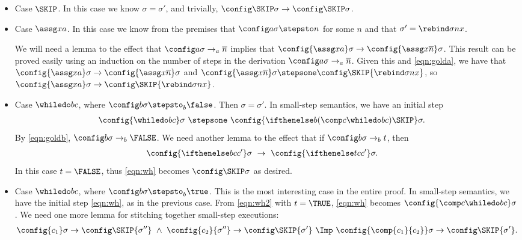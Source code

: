 \begin{itemize}
\item
Case $\SKIP$. In this case we know $\sigma = \sigma'$, and trivially,
$\config\SKIP\sigma \rightarrow \config\SKIP\sigma$.
\item
Case $\assg xa$. In this case we know from the premises that
$\config a\sigma \stepsto n$ for some $n$ and that $\sigma' = \rebind\sigma nx$.

We will need a lemma to the effect that $\config a\sigma\rightarrow_a\overline n$ implies that $\config{\assg xa}\sigma
\rightarrow \config{\assg x{\overline n}}\sigma$. This result can be proved easily using an
induction on the number of steps in the derivation $\config a\sigma\rightarrow_a\overline n$.
Given this and \eqref{eqn:golda}, we have that $\config{\assg xa}\sigma \rightarrow \config{\assg x{\overline n}}\sigma$ and
$\config{\assg x{\overline n}}\sigma \stepsone \config\SKIP{\rebind\sigma nx}$, so
$\config{\assg xa}\sigma \rightarrow \config\SKIP{\rebind\sigma nx}$.

\item
Case $\whiledo bc$, where $\config b\sigma \stepsto_b \false$. Then $\sigma=\sigma'$.
In small-step semantics, we have an initial step
\begin{align}
\config{\whiledo bc}\sigma\ &\stepsone\ \config{\ifthenelse b{(\comp c{\whiledo bc})}\SKIP}\sigma.\label{eqn:wh}
\end{align}
By \eqref{eqn:goldb},
$\config b\sigma \rightarrow_b \FALSE$. We need another lemma to the effect that if
$\config b\sigma \rightarrow_b t$, then
\begin{align}
\config{\ifthenelse bc{c'}}\sigma\ &\rightarrow\ \config{\ifthenelse tc{c'}}\sigma.\label{eqn:wh2}
\end{align}
In this case $t=\FALSE$, thus \eqref{eqn:wh} becomes $\config\SKIP\sigma$ as desired.

\item
Case $\whiledo bc$, where $\config b\sigma \stepsto_b \true$.
This is the most interesting case in the entire proof.
In small-step semantics, we have the initial step \eqref{eqn:wh}, as in the previous case.
From \eqref{eqn:wh2} with $t=\TRUE$, \eqref{eqn:wh} becomes
$\config{\comp c{\whiledo bc}}\sigma$. We need one more lemma for stitching together
small-step executions:
\begin{align}
\config{c_1}\sigma \rightarrow \config\SKIP{\sigma''}\ \wedge\ \config{c_2}{\sigma''} \rightarrow \config\SKIP{\sigma'}\
\Imp\ \config{\comp{c_1}{c_2}}\sigma \rightarrow \config\SKIP{\sigma'}. \label{eqn:seq}
\end{align}


\end{itemize}
